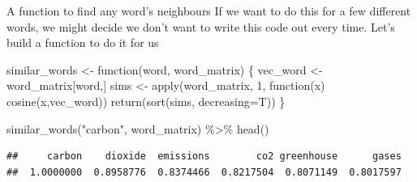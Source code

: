 \documentclass[
  10pt,
  ignorenonframetext,
  aspectratio=169]{beamer}
\newenvironment{Shaded}{\begin{snugshade}}{\end{snugshade}}
\newcommand{\AttributeTok}[1]{\textcolor[rgb]{0.80,0.80,0.80}{#1}}
\newcommand{\ControlFlowTok}[1]{\textcolor[rgb]{0.94,0.87,0.69}{#1}}
\newcommand{\DecValTok}[1]{\textcolor[rgb]{0.86,0.86,0.80}{#1}}
\newcommand{\FunctionTok}[1]{\textcolor[rgb]{0.94,0.94,0.56}{#1}}
\newcommand{\NormalTok}[1]{\textcolor[rgb]{0.80,0.80,0.80}{#1}}
\newcommand{\OtherTok}[1]{\textcolor[rgb]{0.94,0.94,0.56}{#1}}
\newcommand{\SpecialCharTok}[1]{\textcolor[rgb]{0.86,0.64,0.64}{#1}}
\newcommand{\StringTok}[1]{\textcolor[rgb]{0.80,0.58,0.58}{#1}}
\begin{document}
\begin{frame}[fragile]{A function to find any word's neighbours}
\protect\hypertarget{a-function-to-find-any-words-neighbours}{}
If we want to do this for a few different words, we might decide we
don't want to write this code out every time. Let's build a function to
do it for us

\medskip

\scriptsize

\begin{Shaded}
\begin{Highlighting}[]
\NormalTok{similar\_words }\OtherTok{\textless{}{-}} \ControlFlowTok{function}\NormalTok{(word, word\_matrix) \{}
\NormalTok{  vec\_word }\OtherTok{\textless{}{-}}\NormalTok{ word\_matrix[word,]}
\NormalTok{  sims }\OtherTok{\textless{}{-}} \FunctionTok{apply}\NormalTok{(word\_matrix, }\DecValTok{1}\NormalTok{, }\ControlFlowTok{function}\NormalTok{(x) }\FunctionTok{cosine}\NormalTok{(x,vec\_word))}
  \FunctionTok{return}\NormalTok{(}\FunctionTok{sort}\NormalTok{(sims, }\AttributeTok{decreasing=}\NormalTok{T))}
\NormalTok{\}}

\FunctionTok{similar\_words}\NormalTok{(}\StringTok{"carbon"}\NormalTok{, word\_matrix) }\SpecialCharTok{\%\textgreater{}\%} \FunctionTok{head}\NormalTok{()}
\end{Highlighting}
\end{Shaded}

\begin{verbatim}
##     carbon    dioxide  emissions        co2 greenhouse      gases 
##  1.0000000  0.8958776  0.8374466  0.8217504  0.8071149  0.8017597
\end{verbatim}
\end{frame}
\end{document}
